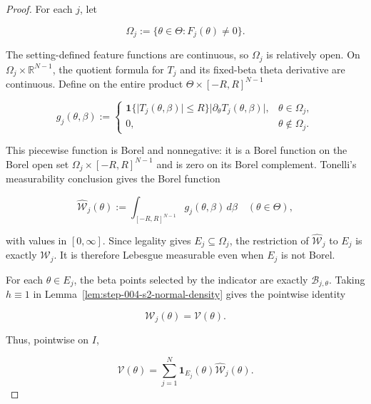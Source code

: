 \begin{proof}
For each \(j\), let

\begin{equation}
\label{eq:appendix-display-135}
\Omega_j:=\{\theta\in\Theta:F_j(\theta)\neq0\}.
\end{equation}

The setting-defined feature functions are continuous, so \(\Omega_j\) is relatively open. On
\(\Omega_j\times\mathbb R^{N-1}\), the quotient formula for \(T_j\) and its fixed-beta theta derivative are
continuous. Define on the entire product \(\Theta\times[-R,R]^{N-1}\)

\begin{equation}
\label{eq:appendix-display-136}
g_j(\theta,\beta)
:=
\begin{cases}
\mathbf1\{\lvert T_j(\theta,\beta)\rvert\leq R\}
\lvert\partial_\theta T_j(\theta,\beta)\rvert,
&\theta\in\Omega_j,\\
0,&\theta\notin\Omega_j.
\end{cases}
\end{equation}

This piecewise function is Borel and nonnegative: it is a Borel function on the Borel open set
\(\Omega_j\times[-R,R]^{N-1}\) and is zero on its Borel complement. Tonelli's measurability conclusion gives
the Borel function

\begin{equation}
\label{eq:appendix-display-137}
\widehat{\mathcal W}_j(\theta)
:=\int_{[-R,R]^{N-1}}g_j(\theta,\beta)\,d\beta
\quad(\theta\in\Theta),
\end{equation}

with values in \([0,\infty]\). Since legality gives \(E_j\subseteq\Omega_j\), the restriction of
\(\widehat{\mathcal W}_j\) to \(E_j\) is exactly \(\mathcal W_j\). It is therefore Lebesgue measurable even
when \(E_j\) is not Borel.

For each \(\theta\in E_j\), the beta points selected by the indicator are exactly
\(\mathcal B_{j,\theta}\). Taking \(h\equiv1\) in
Lemma~\ref{lem:step-004-s2-normal-density} gives the pointwise identity

\begin{equation}
\label{eq:appendix-display-138}
\mathcal W_j(\theta)=\mathcal V(\theta).
\end{equation}

Thus, pointwise on \(I\),

\begin{equation}
\label{eq:appendix-display-139}
\mathcal V(\theta)
=\sum_{j=1}^N\mathbf1_{E_j}(\theta)
\widehat{\mathcal W}_j(\theta).
\end{equation}


\end{proof}
